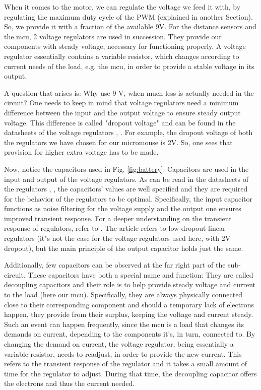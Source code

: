 \FloatBarrier

When it comes to the motor, we can regulate the voltage we feed it with, by regulating the maximum duty cycle of the PWM (explained in another Section). So, we provide it with a fraction of the available 9V.
For the distance sensors and the mcu, 2 voltage regulators are used in succession. They provide our components with steady voltage, necessary for functioning properly. A voltage regulator essentially contains a variable resistor, which changes according to current needs of the load, e.g. the mcu, in order to provide a stable voltage in its output.

A question that arises is: Why use 9 V, when much less is actually needed in the circuit? One needs to keep in mind that voltage regulators need a minimum difference between the input and the output voltage to ensure steady output voltage. This difference is called "dropout voltage" and can be found in the datasheets of the voltage regulators \cite{3.3V}, \cite{5V}. For example, the dropout voltage of both the regulators we have chosen for our micromouse is 2V. So, one sees that provision for higher extra voltage has to be made.

Now, notice the capacitors used in Fig. \ref{fig:battery}. Capacitors are used in the input and output of the voltage regulators. As can be read in the datasheets of the regulators \cite{3.3V}, \cite{5V}, the capacitors' values are well specified and they are required for the behavior of the regulators to be optimal. Specifically, the input capacitor functions as noise filtering for the voltage supply and the output one ensures improved transient response. For a deeper understanding on the transient response of regulators, refer to \cite{regul}. The article refers to low-dropout linear regulators (it"s not the case for the voltage regulators used here, with 2V dropout), but the main principle of the output capacitor holds just the same.

Additionally,  few capacitors can be observed at the far right part of the sub-circuit.
These capacitors have both a special name and function: They are called decoupling capacitors and their role is to help provide steady voltage and current to the load (here our mcu). Specifically, they are always physically connected close to their corresponding component and should a temporary lack of electrons happen, they provide from their surplus, keeping the voltage and current steady. Such an event can happen frequently, since the mcu is a load that changes its demands on current, depending to the components it's,  in turn, connected to. By changing the demand on current, the voltage regulator, being essentially a variable resistor, needs to readjust, in order to provide the new current. This refers to the transient response of the regulator and it takes a small amount of time for the regulator to adjust. During that time, the decoupling capacitor offers the electrons and thus the current needed.

